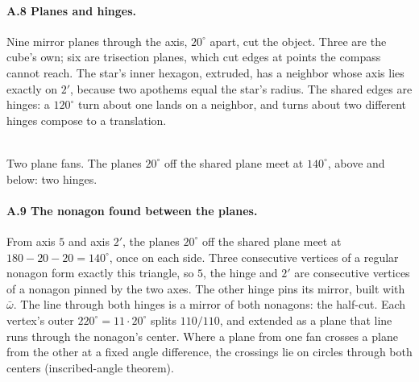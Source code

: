 \documentclass[11pt]{article}
\theoremstyle{definition}\newtheorem{claim}{Capability}
\theoremstyle{remark}
\begin{document}
\paragraph{A.8 Planes and hinges.} Nine mirror planes through the axis, $20^\circ$ apart, cut the object. Three are the cube's own; six are trisection planes, which cut edges at points the compass cannot reach. The star's inner hexagon, extruded, has a neighbor whose axis lies exactly on $2'$, because two apothems equal the star's radius. The shared edges are hinges: a $120^\circ$ turn about one lands on a neighbor, and turns about two different hinges compose to a translation.

\begin{center}
\\
\footnotesize Two plane fans. The planes $20^\circ$ off the shared plane meet at $140^\circ$, above and below: two hinges.
\end{center}

\paragraph{A.9 The nonagon found between the planes.} From axis $5$ and axis $2'$, the planes $20^\circ$ off the shared plane meet at $180-20-20=140^\circ$, once on each side. Three consecutive vertices of a regular nonagon form exactly this triangle, so $5$, the hinge and $2'$ are consecutive vertices of a nonagon pinned by the two axes. The other hinge pins its mirror, built with $\bar\omega$. The line through both hinges is a mirror of both nonagons: the half-cut. Each vertex's outer $220^\circ=11\cdot20^\circ$ splits $110/110$, and extended as a plane that line runs through the nonagon's center. Where a plane from one fan crosses a plane from the other at a fixed angle difference, the crossings lie on circles through both centers (inscribed-angle theorem).
\end{document}
